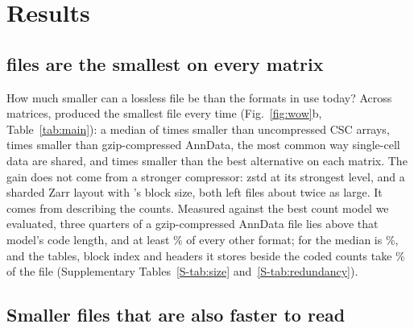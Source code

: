 \section{Results}
\label{sec:results}

\subsection{\sone{} files are the smallest on every matrix}

How much smaller can a lossless file be than the formats in use today? Across  matrices, \sone{} produced
the smallest file every time (Fig.~\ref{fig:wow}b, Table~\ref{tab:main}): a median of  times smaller than
uncompressed CSC arrays,  times smaller than gzip-compressed AnnData, the most common way single-cell
data are shared, and  times smaller than the best alternative on each matrix. The gain does not come
from a stronger compressor: zstd at its strongest level, and a sharded Zarr layout with \sone's block size, both left files
about twice as large. It comes from describing the counts. Measured against the best count model we evaluated, three
quarters of a gzip-compressed AnnData file lies above that model's code length, and at least \% of
every other format; for \sone{} the median is \%, and the tables, block index and headers it stores beside
the coded counts take \% of the file (Supplementary Tables~\ref{S-tab:size}
and~\ref{S-tab:redundancy}).



\subsection{Smaller files that are also faster to read}

